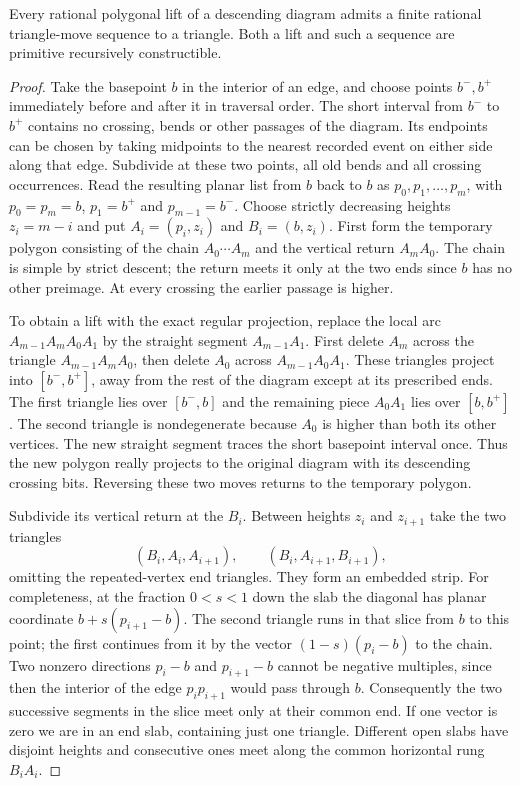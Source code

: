 \begin{theorem}
Every rational polygonal lift of a descending diagram admits a finite
rational triangle-move sequence to a triangle. Both a lift and such
a sequence are primitive recursively constructible.
\end{theorem}
\begin{proof}
Take the basepoint $b$ in the interior of an edge, and choose points
$b^-,b^+$ immediately before and after it in traversal order.
The short interval from $b^-$ to $b^+$ contains no crossing, bends or
other passages of the diagram. Its endpoints can be chosen by taking
midpoints to the nearest recorded event on either side along that edge.
Subdivide at these two points, all old bends and all crossing occurrences.
Read the resulting planar list from $b$ back to $b$ as
$p_0,p_1,\ldots,p_m$, with $p_0=p_m=b$, $p_1=b^+$ and $p_{m-1}=b^-$.
Choose strictly decreasing heights $z_i=m-i$ and put
$A_i=(p_i,z_i)$ and $B_i=(b,z_i)$. First form the temporary polygon
consisting of the chain $A_0\cdots A_m$ and the vertical return
$A_m A_0$. The chain is simple by strict descent; the return meets it
only at the two ends since $b$ has no other preimage. At every crossing
the earlier passage is higher.

To obtain a lift with the exact regular projection, replace the local
arc $A_{m-1}A_m A_0 A_1$ by the straight segment $A_{m-1}A_1$.
First delete $A_m$ across the triangle $A_{m-1}A_mA_0$, then delete
$A_0$ across $A_{m-1}A_0A_1$. These triangles project into
$[b^-,b^+]$, away from the rest of the diagram except at its prescribed
ends. The first triangle lies over $[b^-,b]$ and the remaining piece
$A_0A_1$ lies over $[b,b^+]$. The second triangle is nondegenerate
because $A_0$ is higher than both its other vertices. The new straight
segment traces the short basepoint interval once. Thus the new polygon
really projects to the original diagram with its descending crossing
bits. Reversing these two moves returns to the temporary polygon.

Subdivide its vertical return at the $B_i$. Between heights $z_i$ and
$z_{i+1}$ take the two triangles
\[
 (B_i,A_i,A_{i+1}),\qquad (B_i,A_{i+1},B_{i+1}),
\]
omitting the repeated-vertex end triangles. They form an embedded strip.
For completeness, at the fraction $0<s<1$ down the slab the diagonal
has planar coordinate $b+s(p_{i+1}-b)$. The second triangle runs in
that slice from $b$ to this point; the first continues from it by the
vector $(1-s)(p_i-b)$ to the chain. Two nonzero directions
$p_i-b$ and $p_{i+1}-b$ cannot be negative multiples, since then the
interior of the edge $p_i p_{i+1}$ would pass through $b$. Consequently
the two successive segments in the slice meet only at their common end.
If one vector is zero we are in an end slab, containing just one
triangle. Different open slabs have disjoint heights and consecutive
ones meet along the common horizontal rung $B_i A_i$.


\end{proof}
